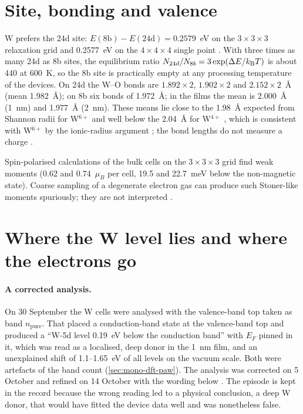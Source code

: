 \section{Site, bonding and valence}
\label{sec:mono-w-site}

W prefers the 24d site: $E(8\mathrm{b}) - E(24\mathrm{d}) = 0.2579$~eV on the $3\times3\times3$ relaxation grid and
0.2577~eV on the $4\times4\times4$ single point . With three times as many 24d as 8b sites, the equilibrium ratio
$N_{24d}/N_{8b} = 3\exp(\Delta E/k_{\mathrm{B}}T)$ is about 440 at 600~K, so the 8b site is practically empty at any processing
temperature of the devices. On 24d the W--O bonds are $1.892\times2$, $1.902\times2$ and $2.152\times2$~\AA{} (mean
1.982~\AA); on 8b six bonds of 1.972~\AA; in the films the mean is 2.000~\AA{} (1~nm) and 1.977~\AA{} (2~nm). These means
lie close to the 1.98~\AA{} expected from Shannon radii for W$^{6+}$ and well below the 2.04~\AA{} for W$^{4+}$
\citep{Shannon1976}, which is consistent with W$^{6+}$ by the ionic-radius argument ; the bond lengths do not
measure a charge .

Spin-polarised calculations of the bulk cells on the $3\times3\times3$ grid find weak moments (0.62 and 0.74~$\mu_B$ per
cell, 19.5 and 22.7~meV below the non-magnetic state). Coarse sampling of a degenerate electron gas can produce such
Stoner-like moments spuriously; they are not interpreted  .

\section{Where the W level lies and where the electrons go}
\label{sec:mono-w-level}

\paragraph{A corrected analysis.} On 30 September the W cells were analysed with the valence-band top taken as band
$n_{\mathrm{pure}}$. That placed a conduction-band state at the valence-band top and produced a ``W-5d level 0.19~eV
below the conduction band'' with $E_F$ pinned in it, which was read as a localised, deep donor in the 1~nm film, and an
unexplained shift of 1.1--1.65~eV of all levels on the vacuum scale. Both were artefacts of the band count
(\cref{sec:mono-dft-paw}). The analysis was corrected on 5 October and refined on 14 October with the wording below
. The episode is kept in the record because the wrong reading led to a physical conclusion, a deep W donor,
that would have fitted the device data well and was nonetheless false.

